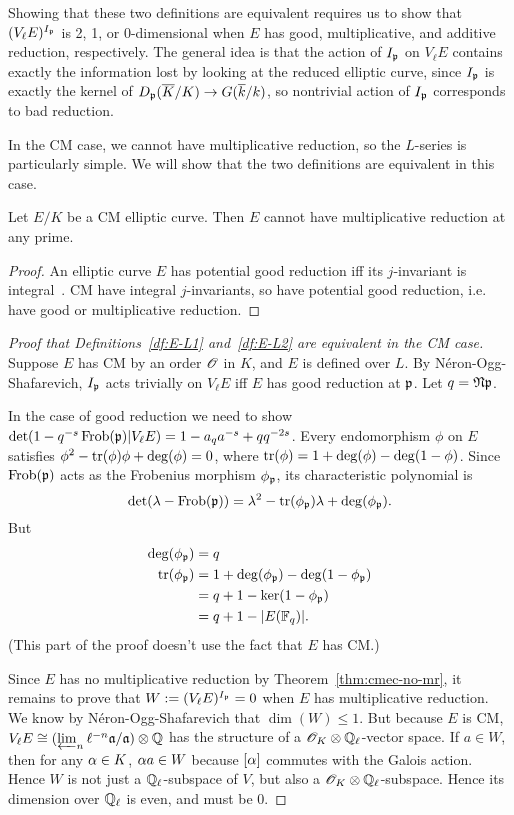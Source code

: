 Showing that these two definitions are equivalent requires us to show that $(V_{\ell}E)^{I_{\mathfrak{p}}}$ is 2, 1, or 0-dimensional when $E$ has good, multiplicative, and additive reduction, respectively. The general idea is that the action of $I_{\mathfrak{p}}$ on $V_{\ell}E$ contains exactly the information lost by looking at the reduced elliptic curve, since $I_{\mathfrak{p}}$ is exactly the kernel of $D_{\mathfrak{p}}(\overline{K}/K)\to G(\overline{k}/k)$, so nontrivial action of $I_{\mathfrak{p}}$ corresponds to bad reduction.

In the CM case, we cannot have multiplicative reduction, so the $L$-series is particularly simple. We will show that the two definitions are equivalent in this case.
\begin{thm}
Let $E/K$ be a CM elliptic curve. Then $E$ cannot have multiplicative reduction at any prime.
\end{thm}
\begin{proof}
An elliptic curve $E$ has potential good reduction iff its $j$-invariant is integral~\cite[VII.5.5]{Si86}. CM have integral $j$-invariants, so have potential good reduction, i.e. have good or multiplicative reduction.  
\end{proof}
\begin{proof}[Proof that Definitions~\ref{df:E-L1} and~\ref{df:E-L2} are equivalent in the CM case]
Suppose $E$ has CM by an order $\mathscr{O}$ in $K$, and $E$ is defined over $L$. 
By N\'eron-Ogg-Shafarevich, $I_{\mathfrak{p}}$ acts trivially on $V_{\ell}E$ iff $E$ has good reduction at $\mathfrak{p}$. Let $q=\mathfrak{N}\mathfrak{p}$.

In the case of good reduction we need to show $\det(1-q^{-s}\operatorname{Frob}(\mathfrak{p})|V_{\ell}E)=1-a_qa^{-s}+qq^{-2s}$.
Every endomorphism $\phi$ on $E$ satisfies $\phi^2-\operatorname{tr}(\phi)\phi+\deg(\phi)=0$, where $\operatorname{tr}(\phi)=1+\deg(\phi)-\deg(1-\phi)$. Since $\operatorname{Frob}(\mathfrak{p})$ acts as the Frobenius morphism $\phi_{\mathfrak{p}}$, its characteristic polynomial is
\[
\det(\lambda-\operatorname{Frob}(\mathfrak{p}))= \lambda^2-\operatorname{tr}(\phi_{\mathfrak{p}})\lambda+\deg(\phi_{\mathfrak{p}}).
\]
But
\begin{align*}
\deg(\phi_{\mathfrak{p}})&=q\\
\operatorname{tr}(\phi_{\mathfrak{p}})&=1+\deg(\phi_{\mathfrak{p}})-\deg(1-\phi_{\mathfrak{p}})\\
&=q+1-\ker(1-\phi_{\mathfrak{p}})\\
&=q+1-|E(\mathbb{F}_q)|.
\end{align*}
(This part of the proof doesn't use the fact that $E$ has CM.)

Since $E$ has no multiplicative reduction by Theorem~\ref{thm:cmec-no-mr}, it remains to prove that $W:=(V_{\ell}E)^{I_{\mathfrak{p}}}=0$ when $E$ has multiplicative reduction. We know by N\'eron-Ogg-Shafarevich that $\dim(W)\le 1$. But because $E$ is CM, $V_{\ell}E\cong (\varprojlim_n \ell^{-n}\mathfrak{a}/\mathfrak{a})\otimes \mathbb{Q}$ has the structure of a $\mathscr{O}_K\otimes \mathbb{Q}_{\ell}$-vector space. If $a\in W$, then for any $\alpha\in K$, $\alpha a\in W$ because $[\alpha]$ commutes with the Galois action. Hence $W$ is not just a $\mathbb{Q}_{\ell}$-subspace of $V$, but also a $\mathscr{O}_K\otimes \mathbb{Q}_{\ell}$-subspace. Hence its dimension over $\mathbb{Q}_{\ell}$ is even, and must be 0.
\end{proof}

